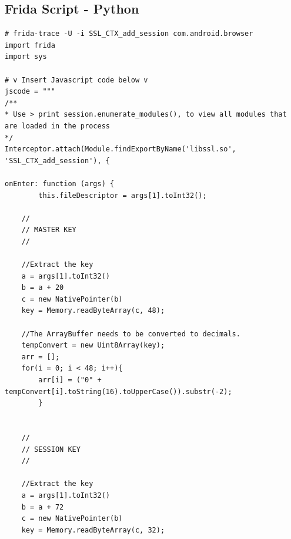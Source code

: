 \documentclass[12pt, a4paper]{report}
\begin{document}
\begin{appendices}
 


\section{Frida Script - Python}

\begin{lstlisting}[frame=single, breaklines=true]
# frida-trace -U -i SSL_CTX_add_session com.android.browser
import frida
import sys
 
# v Insert Javascript code below v
jscode = """
/**
* Use > print session.enumerate_modules(), to view all modules that are loaded in the process
*/ 
Interceptor.attach(Module.findExportByName('libssl.so', 'SSL_CTX_add_session'), {
 
onEnter: function (args) { 	
        this.fileDescriptor = args[1].toInt32();
 
	// 
	// MASTER KEY
	// 
 
	//Extract the key
	a = args[1].toInt32()
	b = a + 20
	c = new NativePointer(b)
	key = Memory.readByteArray(c, 48);
 
	//The ArrayBuffer needs to be converted to decimals. 
	tempConvert = new Uint8Array(key);
	arr = [];
	for(i = 0; i < 48; i++){
		arr[i] = ("0" + tempConvert[i].toString(16).toUpperCase()).substr(-2);
		}
 
 
	//
	// SESSION KEY
	//
 
	//Extract the key
	a = args[1].toInt32()
	b = a + 72
	c = new NativePointer(b)
	key = Memory.readByteArray(c, 32);
 

\end{lstlisting}
\end{appendices}
\end{document}
